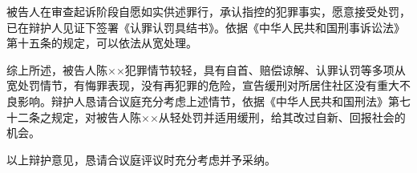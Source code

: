 \documentclass[zihao=-4]{ctexart}
\begin{document}
被告人在审查起诉阶段自愿如实供述罪行，承认指控的犯罪事实，愿意接受处罚，
已在辩护人见证下签署《认罪认罚具结书》。依据《中华人民共和国刑事诉讼法》
第十五条的规定，可以依法从宽处理。

\vspace{0.3\baselineskip}
综上所述，被告人陈××犯罪情节较轻，具有自首、赔偿谅解、认罪认罚等多项从
宽处罚情节，有悔罪表现，没有再犯罪的危险，宣告缓刑对所居住社区没有重大不
良影响。辩护人恳请合议庭充分考虑上述情节，依据《中华人民共和国刑法》第七
十二条之规定，对被告人陈××从轻处罚并适用缓刑，给其改过自新、回报社会的
机会。

以上辩护意见，恳请合议庭评议时充分考虑并予采纳。


\end{document}

